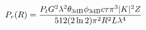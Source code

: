 \documentclass[preview]{standalone}
\begin{document}
\begin{align*}
\special{dvisvgm:raw <g id='unique000'>}P_r(R) = \frac{P_t G^2 \lambda^2 \theta_{\text{3dB}} \phi_{\text{3dB}} c\tau \pi^3 |K|^2 Z}{512 (2\ln 2) \pi^2 R^2 L \lambda^4}\special{dvisvgm:raw </g>}
\end{align*}
\end{document}
